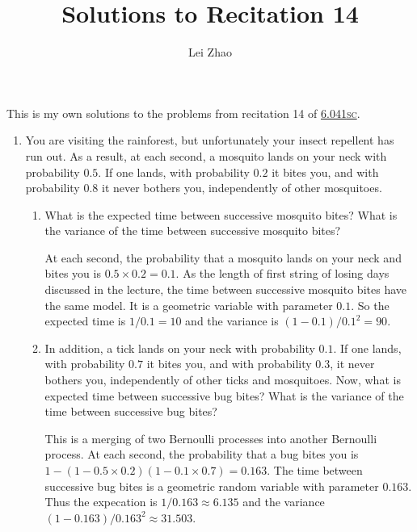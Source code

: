 

\title{Solutions to Recitation 14}
\author{Lei Zhao}


\maketitle

This is my own solutions to the problems from recitation 14 of
\href{https://ocw.mit.edu/courses/electrical-engineering-and-computer-science/6-041sc-probabilistic-systems-analysis-and-applied-probability-fall-2013/unit-iii/lecture-13/}{6.041\textsc{sc}}.

\begin{enumerate}
\item You are visiting the rainforest, but unfortunately your insect
  repellent has run out.  As a result, at each second, a mosquito
  lands on your neck with probability \(0.5\).  If one lands, with
  probability \(0.2\) it bites you, and with probability \(0.8\) it
  never bothers you, independently of other mosquitoes.

  \begin{enumerate} \parasp
  \item What is the expected time between successive mosquito bites?
    What is the variance of the time between successive mosquito
    bites?

    At each second, the probability that a mosquito lands on your neck
    and bites you is \(0.5 \times 0.2 = 0.1\).  As the length of first
    string of losing days discussed in the lecture, the time between
    successive mosquito bites have the same model.  It is a geometric
    variable with parameter \(0.1\). So the expected time is
    \(1/0.1 = 10\) and the variance is \((1-0.1)/0.1^2 = 90\).

  \item In addition, a tick lands on your neck with probability
    \(0.1\).  If one lands, with probability \(0.7\) it bites you, and
    with probability \(0.3\), it never bothers you, independently of
    other ticks and mosquitoes.  Now, what is expected time between
    successive bug bites?  What is the variance of the time between
    successive bug bites?

    This is a merging of two Bernoulli processes into another Bernoulli
    process.  At each second, the probability that a bug bites you is
    \(1 - (1 - 0.5 \times 0.2)(1 - 0.1 \times 0.7) = 0.163\).  The time
    between successive bug bites is a geometric random variable with
    parameter \(0.163\).  Thus the expecation is \(1/0.163 \approx 6.135\)
    and the variance \((1-0.163)/0.163^2 \approx 31.503\).
  \end{enumerate}


\end{enumerate}

